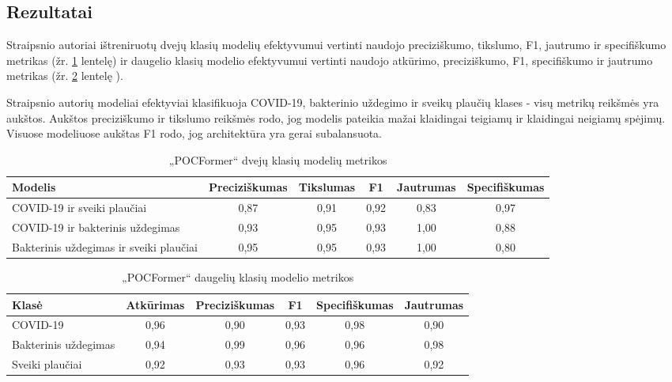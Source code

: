 \documentclass[fleqn]{VUMIFKompMagistrinis}
\begin{document}
\subsection{Rezultatai}
Straipsnio autoriai ištreniruotų dvejų klasių modelių efektyvumui vertinti naudojo preciziškumo, tikslumo, F1, jautrumo ir specifiškumo  metrikas (žr. \ref{tab:statistikos1} lentelę) ir daugelio klasių modelio efektyvumui vertinti naudojo atkūrimo, preciziškumo, F1, specifiškumo ir jautrumo metrikas (žr. \ref{tab:statistikos2} lentelę ). 
\par
Straipsnio autorių modeliai efektyviai klasifikuoja COVID-19, bakterinio uždegimo ir sveikų plaučių klases - visų metrikų reikšmės yra aukštos. Aukštos preciziškumo ir tikslumo reikšmės rodo, jog modelis pateikia mažai klaidingai teigiamų ir klaidingai neigiamų spėjimų. Visuose modeliuose aukštas F1 rodo, jog architektūra yra gerai subalansuota.
\begin{table}[H]\footnotesize
  \centering
  \caption{„POCFormer“ dvejų klasių modelių metrikos \cite{PAY21}}
  \begin{tabular}{|l|c|c|c|c|c|} \hline
    Modelis & Preciziškumas & Tikslumas & F1 & Jautrumas & Specifiškumas \\
    \hline
    COVID-19 ir sveiki plaučiai & 0,87 & 0,91 & 0,92 & 0,83 & 0,97 \\
    COVID-19 ir bakterinis uždegimas & 0,93 & 0,95 & 0,93 & 1,00 & 0,88 \\
    Bakterinis uždegimas ir sveiki plaučiai & 0,95 & 0,95 & 0,93 & 1,00 & 0,80 \\
    \hline
  \end{tabular}
  \label{tab:statistikos1}
\end{table}\begin{table}[H]\footnotesize
  \centering
  \caption{„POCFormer“ daugelių klasių modelio metrikos \cite{PAY21}}
  \begin{tabular}{|l|c|c|c|c|c|} \hline
     Klasė & Atkūrimas & Preciziškumas & F1 & Specifiškumas & Jautrumas \\
    \hline
    COVID-19             & 0,96 & 0,90 & 0,93 & 0,98 & 0,90 \\
    Bakterinis uždegimas & 0,94 & 0,99 & 0,96 & 0,96 & 0,98 \\
    Sveiki plaučiai      & 0,92 & 0,93 & 0,93 & 0,96 & 0,92 \\
    \hline
  \end{tabular}
  \label{tab:statistikos2}
\end{table}
\par
\end{document}
